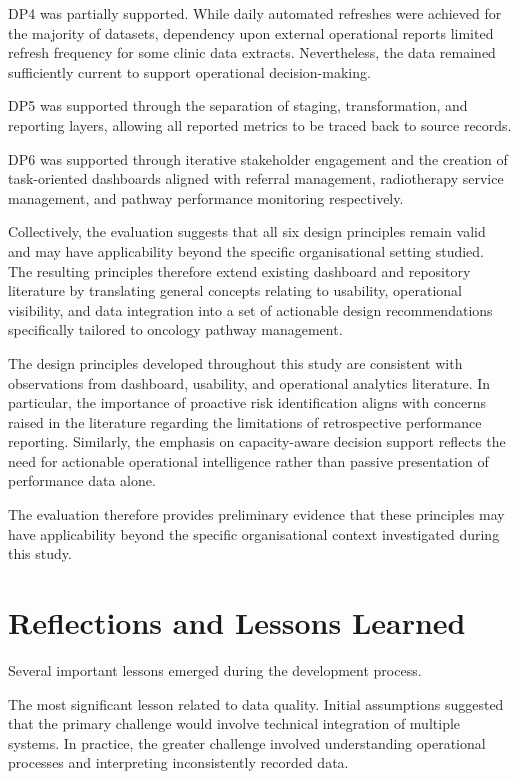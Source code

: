 DP4 was partially supported. While daily automated refreshes were achieved for the majority of datasets, dependency upon external operational reports limited refresh frequency for some clinic data extracts. Nevertheless, the data remained sufficiently current to support operational decision-making. 

DP5 was supported through the separation of staging, transformation, and reporting layers, allowing all reported metrics to be traced back to source records. 

DP6 was supported through iterative stakeholder engagement and the creation of task-oriented dashboards aligned with referral management, radiotherapy service management, and pathway performance monitoring respectively. 

Collectively, the evaluation suggests that all six design principles remain valid and may have applicability beyond the specific organisational setting studied. The resulting principles therefore extend existing dashboard and repository literature by translating general concepts relating to usability, operational visibility, and data integration into a set of actionable design recommendations specifically tailored to oncology pathway management. 

The design principles developed throughout this study are consistent with observations from dashboard, usability, and operational analytics literature. In particular, the importance of proactive risk identification aligns with concerns raised in the literature regarding the limitations of retrospective performance reporting. Similarly, the emphasis on capacity-aware decision support reflects the need for actionable operational intelligence rather than passive presentation of performance data alone.

The evaluation therefore provides preliminary evidence that these principles may have applicability beyond the specific organisational context investigated during this study. 

\section{Reflections and Lessons Learned}
Several important lessons emerged during the development process. 

The most significant lesson related to data quality. Initial assumptions suggested that the primary challenge would involve technical integration of multiple systems. In practice, the greater challenge involved understanding operational processes and interpreting inconsistently recorded data. 

